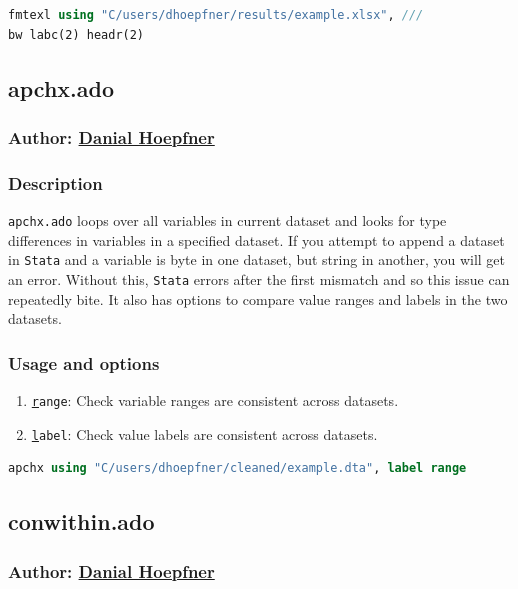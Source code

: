\documentclass[11pt]{article}
\begin{document}
{\begin{lstlisting}[language=Stata, numbers=none]
fmtexl using "C/users/dhoepfner/results/example.xlsx", ///
bw labc(2) headr(2)
\end{lstlisting}

\subsection{apchx.ado}
\subsubsection{Author: \href{mailto:dhoepfner@gibsonconsult.com}{Danial Hoepfner}}
\subsubsection{Description}
\texttt{apchx.ado} loops over all variables in current dataset and looks for type differences in variables in a specified dataset. If you attempt to append a dataset in \texttt{Stata} and a variable is byte in one dataset, but string in another, you will get an error. Without this, \texttt{Stata} errors after the first mismatch and so this issue can repeatedly bite. It also has options to compare value ranges and labels in the two datasets.
\subsubsection{Usage and options}
\begin{enumerate}
\item \texttt{\underline{r}ange}: Check variable ranges are consistent across datasets.
\item \texttt{\underline{l}abel}: Check value labels are consistent across datasets.
\end{enumerate}

\begin{lstlisting}[language=Stata, numbers=none]
apchx using "C/users/dhoepfner/cleaned/example.dta", label range
\end{lstlisting}

\subsection{conwithin.ado}
\subsubsection{Author: \href{mailto:dhoepfner@gibsonconsult.com}{Danial Hoepfner}}
}
\end{document}

